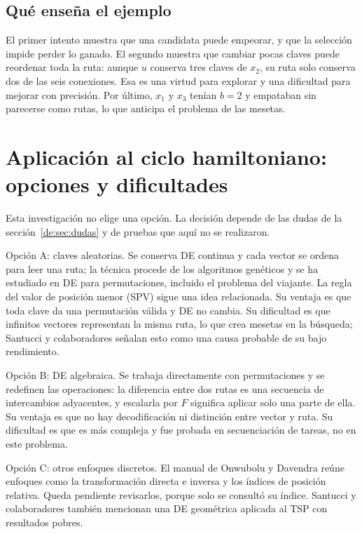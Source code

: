 \subsection{Qué enseña el ejemplo}
El primer intento muestra que una candidata puede empeorar, y que la selección impide perder lo ganado. El segundo muestra que cambiar pocas claves puede reordenar toda la ruta: aunque $u$ conserva tres claves de $x_2$, su ruta solo conserva dos de las seis conexiones. Esa es una virtud para explorar y una dificultad para mejorar con precisión. Por último, $x_1$ y $x_3$ tenían $b=2$ y empataban sin parecerse como rutas, lo que anticipa el problema de las mesetas.

\section{Aplicación al ciclo hamiltoniano: opciones y dificultades}\label{de:sec:opciones}
Esta investigación no elige una opción. La decisión depende de las dudas de la sección~\ref{de:sec:dudas} y de pruebas que aquí no se realizaron.

Opción A: claves aleatorias. Se conserva DE continua y cada vector se ordena para leer una ruta; la técnica procede de los algoritmos genéticos\cite{de13} y se ha estudiado en DE para permutaciones, incluido el problema del viajante.\cite{de14} La regla del valor de posición menor (SPV) sigue una idea relacionada.\cite{de16,de17} Su ventaja es que toda clave da una permutación válida y DE no cambia. Su dificultad es que infinitos vectores representan la misma ruta, lo que crea mesetas en la búsqueda; Santucci y colaboradores señalan esto como una causa probable de su bajo rendimiento.\cite{de15}

Opción B: DE algebraica. Se trabaja directamente con permutaciones y se redefinen las operaciones: la diferencia entre dos rutas es una secuencia de intercambios adyacentes, y escalarla por $F$ significa aplicar solo una parte de ella.\cite{de15} Su ventaja es que no hay decodificación ni distinción entre vector y ruta. Su dificultad es que es más compleja y fue probada en secuenciación de tareas, no en este problema.

Opción C: otros enfoques discretos. El manual de Onwubolu y Davendra reúne enfoques como la transformación directa e inversa y los índices de posición relativa.\cite{de16} Queda pendiente revisarlos, porque solo se consultó su índice. Santucci y colaboradores también mencionan una DE geométrica aplicada al TSP con resultados pobres.\cite{de15}

